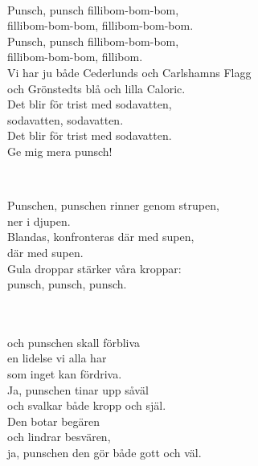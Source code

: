 
 \\       

\songtext{} 
Punsch, punsch fillibom-bom-bom,\\
fillibom-bom-bom, fillibom-bom-bom.\\
Punsch, punsch fillibom-bom-bom,\\
fillibom-bom-bom, fillibom.\\
Vi har ju både Cederlunds och Carlshamns Flagg\\
och Grönstedts blå och lilla Caloric.\\
Det blir för trist med sodavatten,\\
sodavatten, sodavatten.\\
Det blir för trist med sodavatten.\\
Ge mig mera punsch!\\


\newpage 


 \\       

\songtext{}Punschen, punschen rinner genom strupen,\\
ner i djupen.\\
Blandas, konfronteras där med supen,\\
där med supen.\\
Gula droppar stärker våra kroppar:\\
punsch, punsch, punsch.\\


 \\       

\\ 
och punschen skall förbliva\\ 
en lidelse vi alla har\\ 
som inget kan fördriva.\\ 
Ja, punschen tinar upp såväl\\ 
och svalkar både kropp och själ.\\ 
Den botar begären\\ 
och lindrar besvären,\\ 
ja, punschen den gör både gott och väl. 

